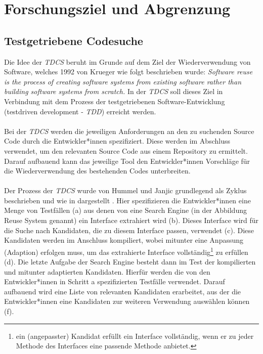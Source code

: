 \chapter{Forschungsziel und Abgrenzung}\label{chap_problem}
\section{Testgetriebene Codesuche}\label{sec_tdcs}
Die Idee der \emph{TDCS} beruht im Grunde auf dem Ziel der Wiederverwendung von Software, welches 1992 von Krueger wie folgt beschrieben wurde:
\emph{\glqq Software reuse is the process of creating software systems from existing software rather than building software systems from scratch.\grqq{}} \cite{krueger} In der \emph{TDCS} soll dieses Ziel in Verbindung mit dem Prozess der testgetriebenen Software-Entwicklung (testdriven development - \emph{TDD}) erreicht werden. \cite{hummel08} 
\\\\
Bei der \emph{TDCS} werden die jeweiligen Anforderungen an den zu suchenden Source Code durch die Entwickler*innen spezifiziert. Diese werden im Abschluss verwendet, um den relevanten Source Code aus einem Repository zu ermittelt. Darauf aufbauend kann das jeweilige Tool den Entwickler*innen Vorschläge für die Wiederverwendung des bestehenden Codes unterbreiten.
\\\\
Der Prozess der \emph{TDCS} wurde von Hummel und Janjic grundlegend als Zyklus beschrieben und wie in  dargestellt  \cite{Hummel2013}.
\noindent
Hier spezifizieren die Entwickler*innen eine Menge von Testfällen (a) aus denen von eine Search \Gls{Engine} (in der Abbildung \glqq Reuse System\grqq{} genannt) ein \Gls{Interface} extrahiert wird (b). Dieses \Gls{Interface} wird für die Suche nach Kandidaten, die zu diesem \Gls{Interface} passen, verwendet (c). Diese Kandidaten werden im Anschluss kompiliert, wobei mitunter eine Anpassung (Adaption) erfolgen muss, um das extrahierte \Gls{Interface} vollständig\footnote{ein (angepasster) Kandidat erfüllt ein \Gls{Interface} vollständig, wenn er zu jeder Methode des \Gls{Interface}s eine passende Methode anbietet.} zu erfüllen (d). Die letzte Aufgabe der Search \Gls{Engine} besteht dann im Test der kompilierten und mitunter adaptierten Kandidaten. Hierfür werden die von den Entwickler*innen in Schritt a spezifizierten Testfälle verwendet. Darauf aufbauend wird eine Liste von relevanten Kandidaten erarbeitet, aus der die Entwickler*innen eine Kandidaten zur weiteren Verwendung auswählen können (f).
